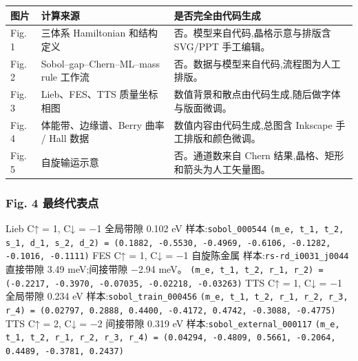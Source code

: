 \documentclass[lang=cn,scheme=chinese,color=blue,device=normal,toc=onecol,math=cm]{elegantbook}
\begin{document}
 
\begin{center}\small
\begin{longtable}{@{}p{} p{} p{}@{}}
\toprule
图片 & 计算来源 & 是否完全由代码生成 \\
\midrule
Fig. 1 & 三体系 Hamiltonian 和结构定义 & 否。模型来自代码,晶格示意与排版含 SVG/\allowbreak{}PPT 手工编辑。 \\
Fig. 2 & Sobol–gap–Chern–ML–mass rule 工作流 & 否。数据与模型来自代码,流程图为人工排版。 \\
Fig. 3 & Lieb、FES、TTS 质量坐标相图 & 数值背景和散点由代码生成,随后做字体与版面微调。 \\
Fig. 4 & 体能带、边缘谱、Berry 曲率 /\allowbreak{} Hall 数据 & 数值内容由代码生成,总图含 Inkscape 手工排版和颜色微调。 \\
Fig. 5 & 自旋输运示意 & 否。通道数来自 Chern 结果,晶格、矩形和箭头为人工矢量图。 \\
\bottomrule
\end{longtable}
\end{center}
 

\subsubsection{Fig. 4 最终代表点}

   Lieb C↑ = 1, C↓ = −1 全局带隙 0.102 eV  样本:\texttt{sobol\_\allowbreak{}000544} \texttt{(m\_\allowbreak{}e, t\_\allowbreak{}1, t\_\allowbreak{}2, s\_\allowbreak{}1, d\_\allowbreak{}1, s\_\allowbreak{}2, d\_\allowbreak{}2) = (0.1882, -0.5530, -0.4969, -0.6106, -0.1282, -0.1016, -0.1111)}    FES C↑ = 1, C↓ = −1 自旋陈金属  样本:\texttt{rs-rd\_\allowbreak{}i0031\_\allowbreak{}j0044} 直接带隙 3.49 meV;间接带隙 −2.94 meV。 \texttt{(m\_\allowbreak{}e, t\_\allowbreak{}1, t\_\allowbreak{}2, r\_\allowbreak{}1, r\_\allowbreak{}2) = (-0.2217, -0.3970, -0.07035, -0.02218, -0.03263)}    TTS C↑ = 1, C↓ = −1 全局带隙 0.234 eV  样本:\texttt{sobol\_\allowbreak{}train\_\allowbreak{}000456} \texttt{(m\_\allowbreak{}e, t\_\allowbreak{}1, t\_\allowbreak{}2, r\_\allowbreak{}1, r\_\allowbreak{}2, r\_\allowbreak{}3, r\_\allowbreak{}4) = (0.02797, 0.2888, 0.4400, -0.4172, 0.4742, -0.3088, -0.4775)}    TTS C↑ = 2, C↓ = −2 间接带隙 0.319 eV  样本:\texttt{sobol\_\allowbreak{}external\_\allowbreak{}000117} \texttt{(m\_\allowbreak{}e, t\_\allowbreak{}1, t\_\allowbreak{}2, r\_\allowbreak{}1, r\_\allowbreak{}2, r\_\allowbreak{}3, r\_\allowbreak{}4) = (0.04294, -0.4809, 0.5661, -0.2064, 0.4489, -0.3781, 0.2437)}  
\end{document}

